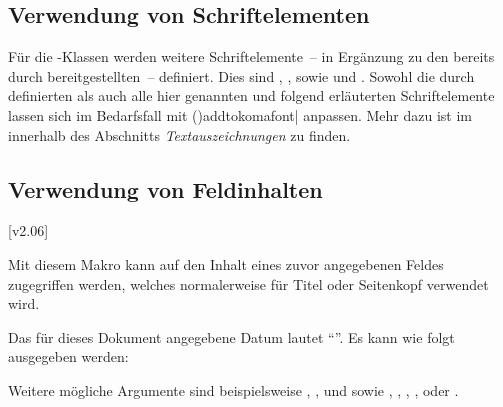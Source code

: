 \begin{DeclareEntity*}{}
\begin{DeclareEntity*}{}
\begin{DeclareEntity*}{}
\subsection{%
  Verwendung von Schriftelementen%
  \label{sec:fonts:elements}%
}

Für die \TUDScript-Klassen werden weitere Schriftelemente~-- in Ergänzung zu 
den bereits durch \KOMAScript bereitgestellten~-- definiert. Dies sind 
, ,  sowie 
und . Sowohl die durch \KOMAScript definierten als auch 
alle hier genannten und folgend erläuterten Schriftelemente lassen sich im 
Bedarfsfall mit 
\Macro(){addtokomafont|}
anpassen. Mehr dazu ist im \scrguide innerhalb des Abschnitts 
\emph{Textauszeichnungen} zu finden.

\begin{quoting}[rightmargin=0pt]
\begin{Code}
\end{Code}
\end{quoting}



\subsection{%
  Verwendung von Feldinhalten%
}

\begin{Declaration}
  {}
  [v2.06]
\printdeclarationlist

Mit diesem Makro kann auf den Inhalt eines zuvor angegebenen Feldes zugegriffen 
werden, welches normalerweise für Titel oder Seitenkopf verwendet wird.
\begin{Example}
Das für dieses Dokument angegebene Datum lautet \enquote{}. Es 
kann wie folgt ausgegeben werden:
\begin{Code}
\end{Code}
\end{Example}
Weitere mögliche Argumente sind beispielsweise , 
,  und  sowie ,
, , ,  oder
.
\end{Declaration}




\end{DeclareEntity*}
\end{DeclareEntity*}
\end{DeclareEntity*}
